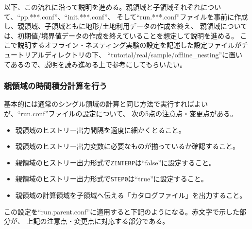 以下、この流れに沿って説明を進める。親領域と子領域それぞれについて、``pp.***.conf''、``init.***.conf''、
そして``run.***.conf''ファイルを事前に作成し、親領域、子領域ともに地形/土地利用データの作成を終え、
親領域については、初期値/境界値データの作成を終えていることを想定して説明を進める。
ここで説明するオフライン・ネスティング実験の設定を記述した設定ファイルがチュートリアルディレクトリの下、
``tutorial/real/sample/offline\_nesting''に置いてあるので、説明を読み進める上で参考にしてもらいたい。

\subsubsection{親領域の時間積分計算を行う}
基本的には通常のシングル領域の計算と同じ方法で実行すればよいが、``run.conf''ファイルの設定について、
次の5点の注意点・変更点がある。

\begin{itemize}
 \item 親領域のヒストリー出力間隔を適度に細かくとること。
 \item 親領域のヒストリー出力変数に必要なものが揃っているか確認すること。
 \item 親領域のヒストリー出力形式で\verb|ZINTERP|は``false''に設定すること。
 \item 親領域のヒストリー出力形式で\verb|STEP0|は``true''に設定すること。
 \item 親領域の計算領域を子領域へ伝える「カタログファイル」を出力すること。
\end{itemize}


この設定を``run.parent.conf''に適用すると下記のようになる。赤文字で示した部分が、
上記の注意点・変更点に対応する部分である。\\

\\

